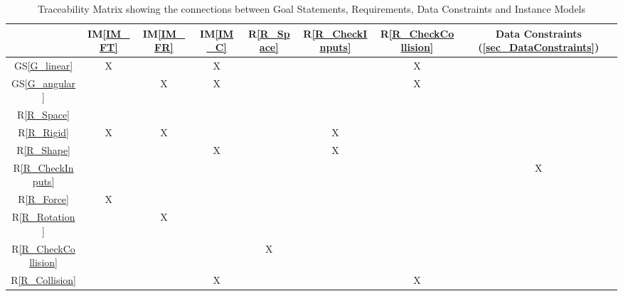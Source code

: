 \documentclass[12pt]{article}
\newcommand{\gsref}[1]{GS\ref{#1}}
\newcommand{\iref}[1]{IM\ref{#1}}
\newcommand{\rref}[1]{R\ref{#1}}
\begin{document}
\renewcommand*{\thetable}{3}
\begin{table}[h!]
\renewcommand*{\arraystretch}{1.2}
\centering
\begin{tabular}{|c|c|c|c|c|c|c|c|}
\hline
& \iref{IM_FT} & \iref{IM_FR} & \iref{IM_C} & \rref{R_Space} & \rref{R_CheckInputs} & \rref{R_CheckCollision} & Data Constraints (\ref{sec_DataConstraints}) \\ \hline
\gsref{G_linear}			&X& &X& & &X& \\ \hline
\gsref{G_angular} 			& &X&X& & &X& \\ \hline
\rref{R_Space} 				& & & & & & & \\ \hline
\rref{R_Rigid} 				&X&X& & &X& & \\ \hline
\rref{R_Shape} 				& & &X& &X& & \\ \hline
\rref{R_CheckInputs} 		& & & & & & &X\\ \hline
\rref{R_Force} 				&X& & & & & & \\ \hline
\rref{R_Rotation} 			& &X& & & & & \\ \hline
\rref{R_CheckCollision} 	& & & &X& & & \\ \hline
\rref{R_Collision} 			& & &X& & &X& \\ \hline
\end{tabular}
\bigskip
\caption{Traceability Matrix showing the connections between Goal Statements, Requirements, Data Constraints and Instance Models} \label{RTraceMatrix}
\end{table}
\renewcommand*{\thetable}{4}
\end{document}
